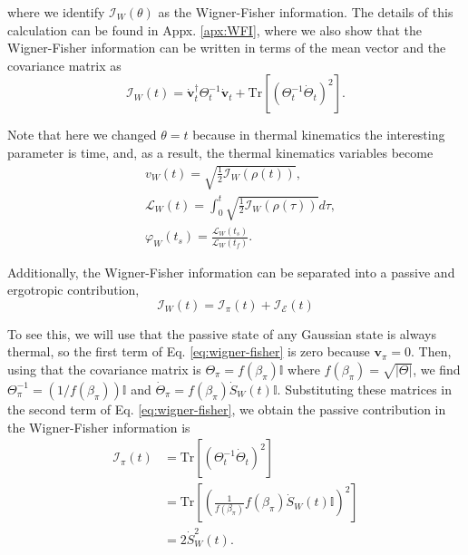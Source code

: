 \noindent where we identify $\mathcal{I}_W(\theta)$ as the Wigner-Fisher information. The details of this calculation can be found in Appx. \ref{apx:WFI}, where we also show that the Wigner-Fisher information can be written in terms of the mean vector and the covariance matrix as
\begin{equation}
    \mathcal{I}_W (t) = \dot{\mathbf{v}}_t^\dagger \Theta^{-1}_t \dot{\mathbf{v}}_t + \text{Tr}[(\Theta_t^{-1} \dot{\Theta}_t)^2].
    \label{eq:wigner-fisher}
\end{equation}

\noindent Note that here we changed $\theta=t$ because in thermal kinematics the interesting parameter is time, and, as a result, the thermal kinematics variables become 
\begin{align}
    &v_W(t) =  \sqrt{\frac{1}{2}\mathcal{I}_W ({\rho}(t))} ,\label{eq:velocidade-gaussian}\\
    &\mathcal{L}_W(t) = \int_0^{t} \sqrt{\frac{1}{2}\mathcal{I}_W ({\rho}(\tau))} d\tau,\label{eq:comprimento-gaussian}\\
    &\varphi_W(t_s) = \frac{\mathcal{L}_W(t_s)}{\mathcal{L}_W(t_f)}. \label{eq:completion-gaussian}
\end{align}

\noindent Additionally, the Wigner-Fisher information can be separated into a passive and ergotropic contribution,
\begin{equation}
    \mathcal{I}_W (t) = \mathcal{I}_\pi (t) + \mathcal{I}_\mathcal{E} (t)
\end{equation}

\noindent To see this, we will use that the passive state of any Gaussian state is always thermal, so the first term of Eq. \eqref{eq:wigner-fisher} is zero because $\mathbf{v}_\pi = 0$. Then, using that the covariance matrix is $\Theta_\pi = f(\beta_\pi) \mathbb{I}$ where $f(\beta_\pi) = \sqrt{|\Theta|}$, we find $\Theta_\pi^{-1} = (1/f(\beta_\pi))\mathbb{I}$ and $\dot{\Theta}_\pi = f(\beta_\pi) \dot{S}_W(t) \mathbb{I}$. Substituting these matrices in the second term of Eq. \eqref{eq:wigner-fisher}, we obtain the passive contribution in the Wigner-Fisher information is
\begin{equation}
    \begin{split}
        \mathcal{I}_\pi (t) &= \text{Tr}[(\Theta_t^{-1} \dot{\Theta}_t)^2]\\
        &= \text{Tr}\left[\left(\frac{1}{f(\beta_\pi)} f(\beta_\pi) \dot{S}_W(t) \mathbb{I}\right)^2\right]\\
        &= 2 \dot{S}_W^2 (t).
    \end{split}
    \label{eq:passive-wigner-fisher}
\end{equation}

